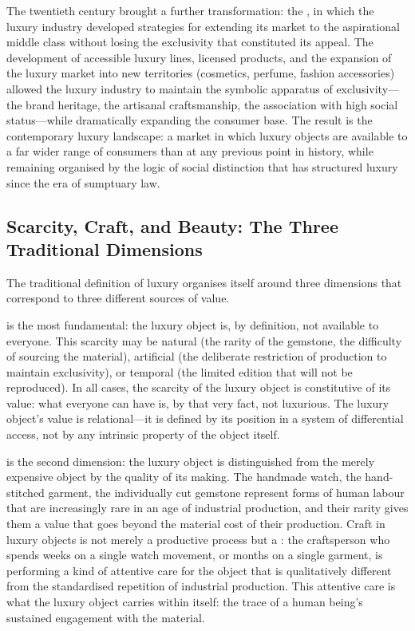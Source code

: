 The twentieth century brought a further transformation: the , in which the luxury industry developed strategies for extending its market to the aspirational middle class without losing the exclusivity that constituted its appeal. The development of accessible luxury lines, licensed products, and the expansion of the luxury market into new territories (cosmetics, perfume, fashion accessories) allowed the luxury industry to maintain the symbolic apparatus of exclusivity---the brand heritage, the artisanal craftsmanship, the association with high social status---while dramatically expanding the consumer base. The result is the contemporary luxury landscape: a market in which luxury objects are available to a far wider range of consumers than at any previous point in history, while remaining organised by the logic of social distinction that has structured luxury since the era of sumptuary law.

\subsection{Scarcity, Craft, and Beauty: The Three Traditional Dimensions}
\label{p16:subsec:traditional}

\noindent
The traditional definition of luxury organises itself around three dimensions that correspond to three different sources of value.

 is the most fundamental: the luxury object is, by definition, not available to everyone. This scarcity may be natural (the rarity of the gemstone, the difficulty of sourcing the material), artificial (the deliberate restriction of production to maintain exclusivity), or temporal (the limited edition that will not be reproduced). In all cases, the scarcity of the luxury object is constitutive of its value: what everyone can have is, by that very fact, not luxurious. The luxury object's value is relational---it is defined by its position in a system of differential access, not by any intrinsic property of the object itself.

 is the second dimension: the luxury object is distinguished from the merely expensive object by the quality of its making. The handmade watch, the hand-stitched garment, the individually cut gemstone represent forms of human labour that are increasingly rare in an age of industrial production, and their rarity gives them a value that goes beyond the material cost of their production. Craft in luxury objects is not merely a productive process but a : the craftsperson who spends weeks on a single watch movement, or months on a single garment, is performing a kind of attentive care for the object that is qualitatively different from the standardised repetition of industrial production. This attentive care is what the luxury object carries within itself: the trace of a human being's sustained engagement with the material.

